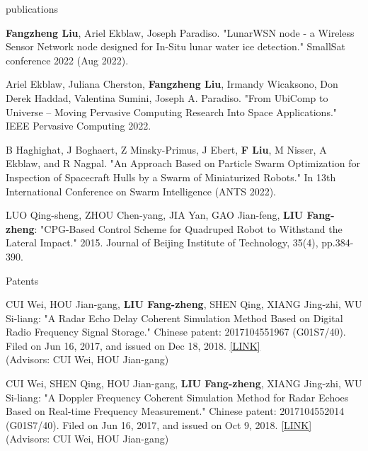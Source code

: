 \documentclass{resume} %
\begin{document}
\begin{rSection}{publications}
\begin{itemlabel}
\item \textbf{Fangzheng Liu}, Ariel Ekblaw, Joseph Paradiso.
"LunarWSN node - a Wireless Sensor Network node designed for In-Situ lunar water ice detection."
SmallSat conference 2022 (Aug 2022).
\smallskip
\smallskip
\smallskip

\item Ariel Ekblaw, Juliana Cherston, \textbf{Fangzheng Liu}, Irmandy Wicaksono, Don Derek Haddad, Valentina Sumini, Joseph A. Paradiso.
"From UbiComp to Universe – Moving Pervasive Computing Research Into Space Applications."
IEEE Pervasive Computing 2022.
\smallskip
\smallskip
\smallskip

\item B Haghighat, J Boghaert, Z Minsky-Primus, J Ebert, \textbf{F Liu}, M Nisser, A Ekblaw, and R Nagpal.
"An Approach Based on Particle Swarm Optimization for Inspection of Spacecraft Hulls by a Swarm of Miniaturized Robots."
In 13th International Conference on Swarm Intelligence (ANTS 2022).
\smallskip
\smallskip
\smallskip

\item LUO Qing-sheng, ZHOU Chen-yang, JIA Yan, GAO Jian-feng, \textbf{LIU Fang-zheng}:
"CPG-Based Control Scheme for Quadruped Robot to Withstand the Lateral Impact."
2015. Journal of Beijing Institute of Technology, 35(4), pp.384-390.
\end{itemlabel}
\end{rSection}

%
\begin{rSection}{Patents}

\begin{itemlabel}
\item CUI Wei, HOU Jian-gang, \textbf{LIU Fang-zheng}, SHEN Qing, XIANG Jing-zhi, WU Si-liang: "A Radar Echo Delay Coherent Simulation Method Based on Digital Radio Frequency Signal Storage." Chinese patent: 2017104551967 (G01S7/40). Filed on Jun 16, 2017, and issued on Dec 18, 2018. \href{http://www.zlqiao.com/zlqiao/patent-f0301af6125548659bae9e05ed9543d6.html}{[LINK]}\\
(Advisors: CUI Wei, HOU Jian-gang)
\smallskip
\smallskip
\smallskip
\item CUI Wei, SHEN Qing, HOU Jian-gang, \textbf{LIU Fang-zheng}, XIANG Jing-zhi, WU Si-liang: "A Doppler Frequency Coherent Simulation Method for Radar Echoes Based on Real-time Frequency Measurement." Chinese patent: 2017104552014 (G01S7/40). Filed on Jun 16, 2017, and issued on Oct 9, 2018. \href{http://www.zlqiao.com/zlqiao/patent-4dc7dd85795d40a08320e507561834ca.html}{[LINK]}\\
(Advisors: CUI Wei, HOU Jian-gang)
\end{itemlabel}
\end{rSection}
\end{document}
